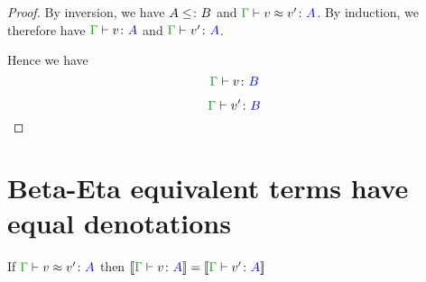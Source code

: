 \documentclass{report}
\begin{document}
\begin{framed}
\begin{proof}
        By inversion, we have $A \leq\colon B$ and $\gberelation{v}{v'}{A}$. By induction, we therefore have $\gtyperelation{v}{A}$ and $\gtyperelation{v'}{A}$.
        
        Hence we have 
        \begin{equation}
            \gtyperelation{v}{B}
        \end{equation}
        
        
        \begin{equation}
            \gtyperelation{v'}{B}
        \end{equation}
        
    \end{proof}
\end{framed}


\section{Beta-Eta equivalent terms have equal denotations}

\begin{theorem}
    If $\gberelation{v}{v'}{A}$ then $\gdenoequality{v}{v'}{A}$
\end{theorem}
\end{document}
